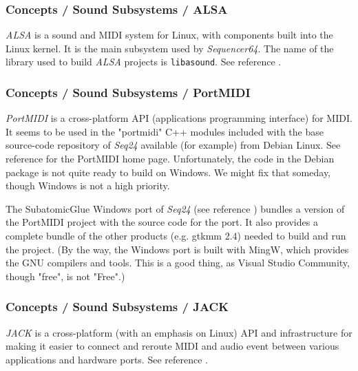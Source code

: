 \subsubsection{Concepts / Sound Subsystems / ALSA}
\label{subsubsec:concepts_sound_alsa}

   \textsl{ALSA} is a sound and MIDI system for Linux, with components built
   into the Linux kernel. It is the main subsystem used by
   \textsl{Sequencer64}.  The name of the library used to build
   \textsl{ALSA} projects is \texttt{libasound}.
   See reference \cite{alsa}.

\subsubsection{Concepts / Sound Subsystems / PortMIDI}
\label{subsubsec:concepts_sound_portmidi}

   \textsl{PortMIDI} is a cross-platform API (applications programming
   interface) for MIDI.  It seems to be used in the "portmidi" C++ modules
   included with the base source-code repository of \textsl{Seq24} available
   (for example) from Debian Linux.  See reference \cite{portmidi}
   for the PortMIDI home page.  Unfortunately, the code in the Debian
   package is not quite ready to build on Windows.  We might fix that
   someday, though Windows is not a high priority.

   The SubatomicGlue Windows port of \textsl{Seq24} (see reference
   \cite{subatomicglue}) bundles a version of the PortMIDI project with the
   source code for the port.  It also provides a complete bundle of the
   other products (e.g. gtkmm 2.4) needed to build and run the project.
   (By the way, the Windows port is built with
   MingW, which provides the GNU compilers and tools.  This is a good thing,
   as Visual Studio Community, though "free", is not "Free".)

\subsubsection{Concepts / Sound Subsystems / JACK}
\label{subsubsec:concepts_sound_jack}

   \textsl{JACK} is a cross-platform (with an emphasis on Linux)
   API and infrastructure for making it easier to connect and reroute MIDI
   and audio event between various applications and hardware ports.
   See reference \cite{jack}.


